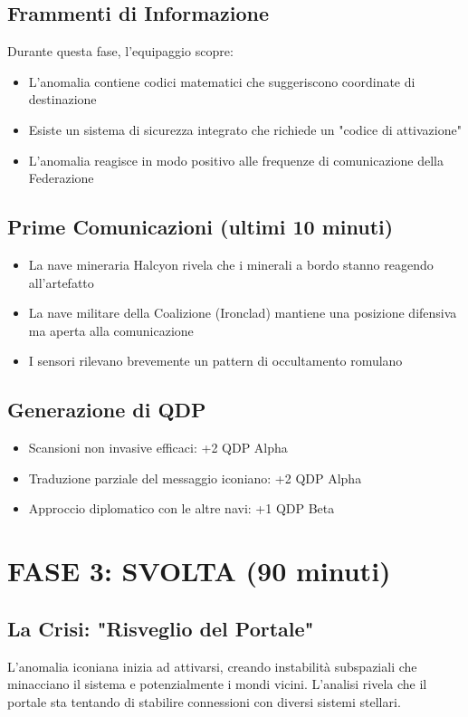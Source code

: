 \documentclass[letterpaper,twocolumn,openany,nodeprecatedcode]{dndbook}
\begin{document}
\subsection{Frammenti di Informazione}
Durante questa fase, l'equipaggio scopre:

\begin{itemize}
    \item L'anomalia contiene codici matematici che suggeriscono coordinate di destinazione
    \item Esiste un sistema di sicurezza integrato che richiede un "codice di attivazione"
    \item L'anomalia reagisce in modo positivo alle frequenze di comunicazione della Federazione
\end{itemize}

\subsection{Prime Comunicazioni (ultimi 10 minuti)}

\begin{itemize}
    \item La nave mineraria Halcyon rivela che i minerali a bordo stanno reagendo all'artefatto
    \item La nave militare della Coalizione (Ironclad) mantiene una posizione difensiva ma aperta alla comunicazione
    \item I sensori rilevano brevemente un pattern di occultamento romulano
\end{itemize}

\subsection{Generazione di QDP}

\begin{itemize}
    \item Scansioni non invasive efficaci: +2 QDP Alpha
    \item Traduzione parziale del messaggio iconiano: +2 QDP Alpha
    \item Approccio diplomatico con le altre navi: +1 QDP Beta
\end{itemize}

\section{FASE 3: SVOLTA (90 minuti)}
\subsection{La Crisi: "Risveglio del Portale"}
L'anomalia iconiana inizia ad attivarsi, creando instabilità subspaziali che minacciano il sistema e potenzialmente i mondi vicini. L'analisi rivela che il portale sta tentando di stabilire connessioni con diversi sistemi stellari.
\end{document}
